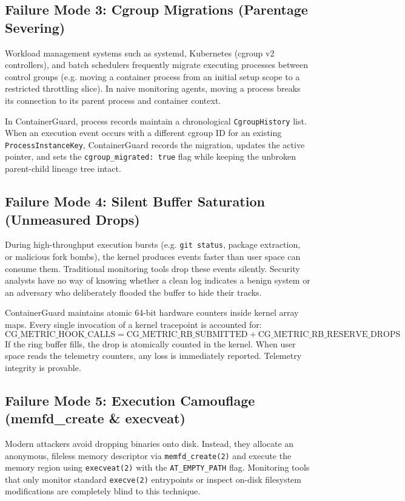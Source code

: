 \documentclass[11pt,a4paper]{article}
\begin{document}
\subsection{Failure Mode 3: Cgroup Migrations (Parentage Severing)}
Workload management systems such as systemd, Kubernetes (cgroup v2 controllers), and batch schedulers frequently migrate executing processes between control groups (e.g. moving a container process from an initial setup scope to a restricted throttling slice). 
In naive monitoring agents, moving a process breaks its connection to its parent process and container context.

\begin{conceptbox}
In ContainerGuard, process records maintain a chronological \texttt{CgroupHistory} list. When an execution event occurs with a different cgroup ID for an existing \texttt{ProcessInstanceKey}, ContainerGuard records the migration, updates the active pointer, and sets the \texttt{cgroup\_migrated: true} flag while keeping the unbroken parent-child lineage tree intact.
\end{conceptbox}

\subsection{Failure Mode 4: Silent Buffer Saturation (Unmeasured Drops)}
During high-throughput execution bursts (e.g. \texttt{git status}, package extraction, or malicious fork bombs), the kernel produces events faster than user space can consume them. 
Traditional monitoring tools drop these events silently. Security analysts have no way of knowing whether a clean log indicates a benign system or an adversary who deliberately flooded the buffer to hide their tracks.

\begin{conceptbox}
ContainerGuard maintains atomic 64-bit hardware counters inside kernel array maps. Every single invocation of a kernel tracepoint is accounted for:
\[
\text{CG\_METRIC\_HOOK\_CALLS} = \text{CG\_METRIC\_RB\_SUBMITTED} + \text{CG\_METRIC\_RB\_RESERVE\_DROPS}
\]
If the ring buffer fills, the drop is atomically counted in the kernel. When user space reads the telemetry counters, any loss is immediately reported. Telemetry integrity is provable.
\end{conceptbox}

\subsection{Failure Mode 5: Execution Camouflage (memfd\_create \& execveat)}
Modern attackers avoid dropping binaries onto disk. Instead, they allocate an anonymous, fileless memory descriptor via \texttt{memfd\_create(2)} and execute the memory region using \texttt{execveat(2)} with the \texttt{AT\_EMPTY\_PATH} flag. 
Monitoring tools that only monitor standard \texttt{execve(2)} entrypoints or inspect on-disk filesystem modifications are completely blind to this technique.
\end{document}
